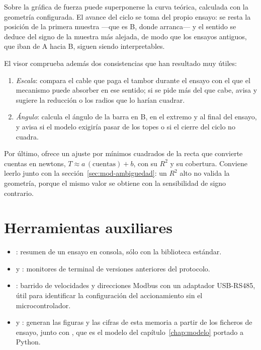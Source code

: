 Sobre la gráfica de fuerza puede superponerse la curva teórica, calculada con la geometría
configurada. El avance del ciclo se toma del propio ensayo: se resta la posición de la primera
muestra ---que es B, donde arranca--- y el sentido se deduce del signo de la muestra más alejada, de
modo que los ensayos antiguos, que iban de A hacia B, siguen siendo interpretables.

El visor comprueba además dos consistencias que han resultado muy útiles:
\begin{enumerate}
  \item \emph{Escala}: compara el cable que paga el tambor durante el ensayo con el que el mecanismo
        puede absorber en ese sentido; si se pide más del que cabe, avisa y sugiere la reducción o
        los radios que lo harían cuadrar.
  \item \emph{Ángulo}: calcula el ángulo de la barra en B, en el extremo y al final del ensayo, y
        avisa si el modelo exigiría pasar de los topes o si el cierre del ciclo no cuadra.
\end{enumerate}

Por último, ofrece un ajuste por mínimos cuadrados de la recta que convierte cuentas en newtons,
$T \approx a\,(\text{cuentas}) + b$, con su $R^2$ y su cobertura. Conviene leerlo junto con la
sección~\ref{sec:mod-ambiguedad}: un $R^2$ alto no valida la geometría, porque el mismo valor se
obtiene con la sensibilidad de signo contrario.

\section{Herramientas auxiliares}

\begin{itemize}
  \item {}: resumen de un ensayo en consola, sólo con la biblioteca estándar.
  \item {} y : monitores de terminal de versiones
        anteriores del protocolo.
  \item {}: barrido de velocidades y direcciones Modbus con un
        adaptador USB-RS485, útil para identificar la configuración del accionamiento sin el
        microcontrolador.
  \item {} y : generan las
        figuras y las cifras de esta memoria a partir de los ficheros de ensayo, junto con
        , que es el modelo del capítulo~\ref{chap:modelo} portado a
        Python.
\end{itemize}

